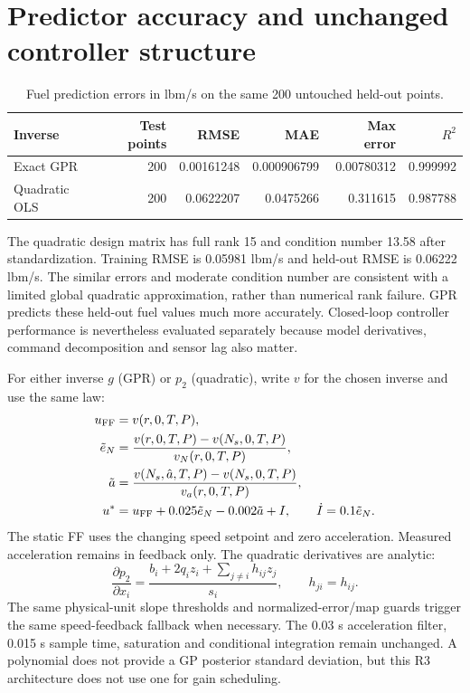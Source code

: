 \documentclass[11pt,a4paper]{article}
\begin{document}
\section{Predictor accuracy and unchanged controller structure}
\begin{table}[H]\centering\small\begin{tabular}{lrrrrr}\toprule
Inverse & Test points & RMSE & MAE & Max error & $R^2$\\\midrule
Exact GPR & 200 & 0.00161248 & 0.000906799 & 0.00780312 & 0.999992\\
Quadratic OLS & 200 & 0.0622207 & 0.0475266 & 0.311615 & 0.987788\\
\bottomrule\end{tabular}\caption{Fuel prediction errors in lbm/s on the same 200 untouched held-out points.}\end{table}
The quadratic design matrix has full rank 15 and condition number 13.58 after standardization. Training RMSE is 0.05981 lbm/s and held-out RMSE is 0.06222 lbm/s. The similar errors and moderate condition number are consistent with a limited global quadratic approximation, rather than numerical rank failure. GPR predicts these held-out fuel values much more accurately. Closed-loop controller performance is nevertheless evaluated separately because model derivatives, command decomposition and sensor lag also matter.

For either inverse $g$ (GPR) or $p_2$ (quadratic), write $v$ for the chosen inverse and use the same law:
\begin{align}
u_{\rm FF}&=v(r,0,T,P),\\
\tilde e_N&=\frac{v(r,0,T,P)-v(N_s,0,T,P)}{v_N(r,0,T,P)},\\
\tilde a&=\frac{v(N_s,\hat a,T,P)-v(N_s,0,T,P)}{v_a(r,0,T,P)},\\
u^*&=u_{\rm FF}+0.025\tilde e_N-0.002\tilde a+I,\qquad \dot I=0.1\tilde e_N.
\end{align}
The static FF uses the changing speed setpoint and zero acceleration. Measured acceleration remains in feedback only. The quadratic derivatives are analytic:
\begin{equation}
\frac{\partial p_2}{\partial x_i}=\frac{b_i+2q_i z_i+\sum_{j\ne i}h_{ij}z_j}{s_i},\qquad h_{ji}=h_{ij}.
\end{equation}
The same physical-unit slope thresholds and normalized-error/map guards trigger the same speed-feedback fallback when necessary. The 0.03 s acceleration filter, 0.015 s sample time, saturation and conditional integration remain unchanged. A polynomial does not provide a GP posterior standard deviation, but this R3 architecture does not use one for gain scheduling.
\end{document}
